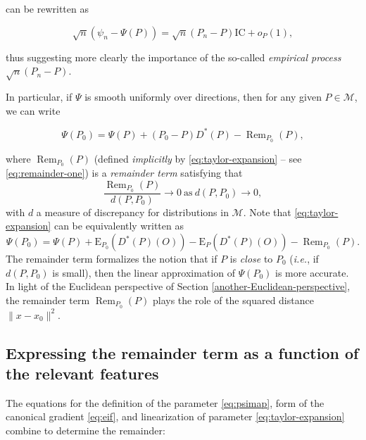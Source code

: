 \documentclass[11pt,openright,twoside]{book}
\DeclareMathOperator{\Rem}{Rem}
\newcommand{\calM}{\mathcal{M}}
\newcommand{\Exp}{\textrm{E}}
\newcommand{\IC}{\textrm{IC}}
\theoremstyle{definition}
\theoremstyle{definition}
\theoremstyle{definition}
\theoremstyle{remark}
\begin{document}
can be rewritten as

\begin{equation*}
\sqrt{n} (\psi_n - \Psi(P)) = \sqrt{n} (P_{n} - P) \IC + o_P(1),
\end{equation*}

thus suggesting more clearly the importance of the so-called \emph{empirical
process} \(\sqrt{n} (P_{n} - P)\).

In particular, if \(\Psi\) is smooth uniformly over directions, then for any
given \(P \in \calM\), we can write

\begin{equation} 
\Psi(P_0)    =   \Psi(P)    +   (P_0    -   P)    D^*(P)   -    \Rem_{P_0}(P),
\label{eq:taylor-expansion} 
\end{equation}

where \(\Rem_{P_0}(P)\) (defined \emph{implicitly} by \eqref{eq:taylor-expansion} --
see \eqref{eq:remainder-one}) is a
\emph{remainder term} satisfying that \begin{equation*} \frac{\Rem_{P_0}(P)}{d(P,
P_0)} \rightarrow  0 \ \mbox{as} \  d(P, P_0) \rightarrow 0  , \end{equation*}
with \(d\) a measure of discrepancy for distributions in \(\calM\). Note that
\eqref{eq:taylor-expansion} can be equivalently written as \begin{equation*}
\Psi(P_0)   =   \Psi(P)   +  \Exp_{P_0}(D^*(P)(O))   -   \Exp_P(D^*(P)(O))   -
\Rem_{P_0}(P).  \end{equation*} The remainder term formalizes the notion that
if \(P\) is \emph{close} to \(P_0\) (\emph{i.e.}, if \(d(P,P_0)\) is small), then the linear
approximation of \(\Psi(P_0)\) is more accurate. In light of
the Euclidean perspective of Section \ref{another-Euclidean-perspective}, the
remainder term \(\Rem_{P_0}(P)\) plays the role of the squared distance \(\|x-x_0\|^{2}\).

\hypertarget{expressing-the-remainder-term-as-a-function-of-the-relevant-features}{%
\subsection{Expressing the remainder term as a function of the relevant features}\label{expressing-the-remainder-term-as-a-function-of-the-relevant-features}}

The equations for the definition of the parameter \eqref{eq:psimap}, form of
the canonical gradient \eqref{eq:eif}, and linearization of parameter
\eqref{eq:taylor-expansion} combine to determine the remainder:
\end{document}
